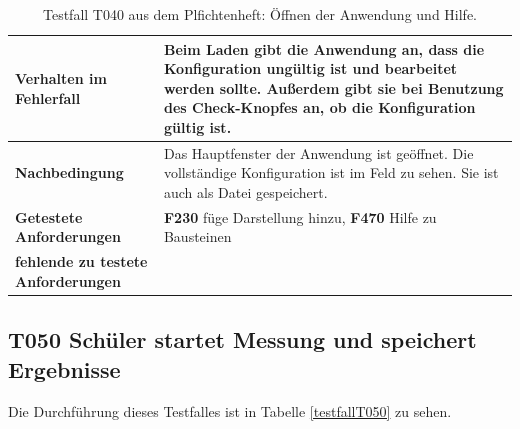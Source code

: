 \documentclass[parskip=full]{scrartcl}
\begin{document}
\begin{table}[h]
\begin{tabular}{| p{4cm} | p{10cm} |}
	\textbf{Verhalten im Fehlerfall}
	& 
	Beim Laden gibt die Anwendung an, dass die Konfiguration ungültig ist und bearbeitet werden sollte. Außerdem gibt sie bei Benutzung des Check-Knopfes an, ob die Konfiguration gültig ist.
	\\ \hline
	
	\textbf{Nachbedingung}
	& 
	Das Hauptfenster der Anwendung ist geöffnet. Die vollständige Konfiguration ist im Feld zu sehen.  Sie ist auch als Datei gespeichert.
	\\ \hline
	
	
	\textbf{Getestete Anforderungen}
	& 
	\textbf{F230} füge Darstellung hinzu, \textbf{F470} Hilfe zu Bausteinen
	\\ \hline
	\textbf{fehlende zu testete Anforderungen}
	& 
	
	\\ \hline
	
	
\end{tabular}
\caption{Testfall T040 aus dem Plfichtenheft: Öffnen der Anwendung und Hilfe.}
\label{testfallT040}
\end{table}

\subsection{\textbf{T050} Schüler startet Messung und speichert Ergebnisse}

Die Durchführung dieses Testfalles ist in Tabelle \ref{testfallT050} zu sehen.
\end{document}
